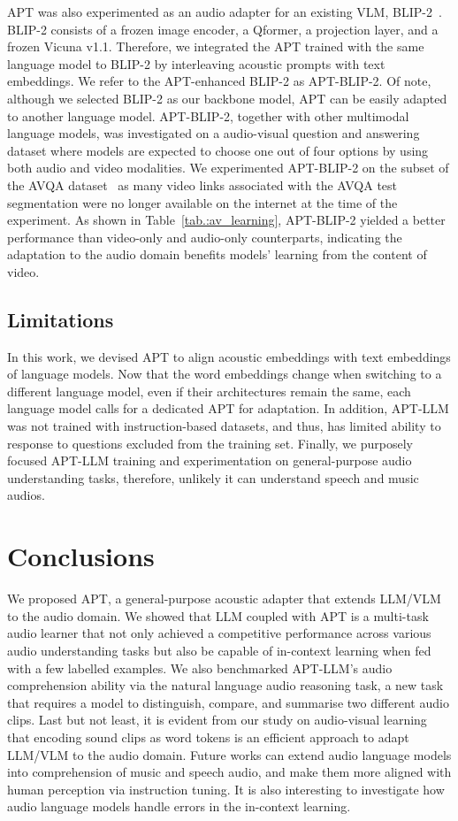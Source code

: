 APT was also experimented as an audio adapter for an existing VLM, BLIP-2~\citep{li_blip-2_2023}. BLIP-2 consists of a frozen image encoder, a Qformer, a projection layer, and a frozen Vicuna v1.1. Therefore, we integrated the APT trained with the same language model to BLIP-2 by interleaving acoustic prompts with text embeddings. We refer to the APT-enhanced BLIP-2 as APT-BLIP-2. Of note, although we selected BLIP-2 as our backbone model, APT can be easily adapted to another language model. APT-BLIP-2, together with other multimodal language models, was investigated on a audio-visual question and answering dataset where models are expected to choose one out of four options by using both audio and video modalities. We experimented APT-BLIP-2 on the subset of the AVQA dataset~\citep{yang_avqa_2022} as many video links associated with the AVQA test segmentation were no longer available on the internet at the time of the experiment. As shown in Table~\ref{tab.:av_learning}, APT-BLIP-2 yielded a better performance than video-only and audio-only counterparts, indicating the adaptation to the audio domain benefits models' learning from the content of video. 

\subsection{Limitations} \label{subsec:limitations}
In this work, we devised APT to align acoustic embeddings with text embeddings of language models. Now that the word embeddings change when switching to a different language model, even if their architectures remain the same, each language model calls for a dedicated APT for adaptation. In addition, APT-LLM was not trained with instruction-based datasets, and thus, has limited ability to response to questions excluded from the training set. Finally, we purposely focused APT-LLM training and experimentation on general-purpose audio understanding tasks, therefore, unlikely it can understand speech and music audios.

\section{Conclusions} \label{sec:conclusions}
We proposed APT, a general-purpose acoustic adapter that extends LLM/VLM to the audio domain. We showed that LLM coupled with APT is a multi-task audio learner that not only achieved a competitive performance across various audio understanding tasks but also be capable of in-context learning when fed with a few labelled examples. We also benchmarked APT-LLM's audio comprehension ability via the natural language audio reasoning task, a new task that requires a model to distinguish, compare, and summarise two different audio clips. Last but not least, it is evident from our study on audio-visual learning that encoding sound clips as word tokens is an efficient approach to adapt LLM/VLM to the audio domain. Future works can extend audio language models into comprehension of music and speech audio, and make them more aligned with human perception via instruction tuning. It is also interesting to investigate how audio language models handle errors in the in-context learning.

\newpage

